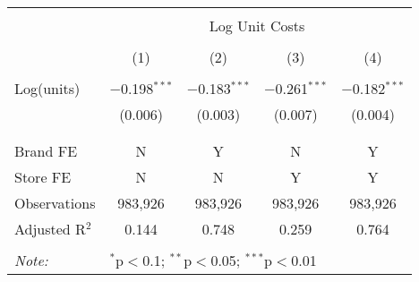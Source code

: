 
\begin{table}[!htbp] \centering 
  \caption{} 
  \label{} 
\begin{tabular}{@{\extracolsep{5pt}}lcccc} 
\\[-1.8ex]\hline 
\hline \\[-1.8ex] 
 & \multicolumn{4}{c}{Log Unit Costs} \\ 
\cline{2-5} 
\\[-1.8ex] & (1) & (2) & (3) & (4)\\ 
\hline \\[-1.8ex] 
 Log(units) & $-$0.198$^{***}$ & $-$0.183$^{***}$ & $-$0.261$^{***}$ & $-$0.182$^{***}$ \\ 
  & (0.006) & (0.003) & (0.007) & (0.004) \\ 
  & & & & \\ 
\hline \\[-1.8ex] 
Brand FE & N & Y & N & Y \\ 
Store FE & N & N & Y & Y \\ 
Observations & 983,926 & 983,926 & 983,926 & 983,926 \\ 
Adjusted R$^{2}$ & 0.144 & 0.748 & 0.259 & 0.764 \\ 
\hline 
\hline \\[-1.8ex] 
\textit{Note:}  & \multicolumn{4}{l}{$^{*}$p$<$0.1; $^{**}$p$<$0.05; $^{***}$p$<$0.01} \\ 
\end{tabular} 
\end{table} 
